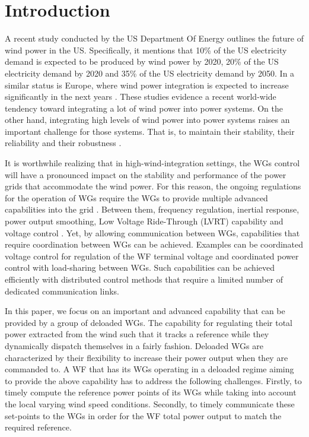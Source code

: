 \documentclass[letterpaper, 10 pt, conference]{ieeeconf}
\begin{document}
\section{Introduction}
A recent study conducted by the  US Department Of Energy \cite{windvision} outlines the future of wind power in the US.  Specifically, it mentions that   10\% of the US electricity demand is expected to be produced by wind power by 2020, 20\% of the US electricity demand  by 2020 and  35\% of the US electricity demand  by 2050. In a similar status is Europe, where wind power integration is expected to increase significantly in the next years \cite{ackerman}. These studies evidence a recent world-wide tendency toward integrating a lot of wind power into power systems. On the other hand, integrating high levels of wind power into power systems raises an important challenge for those systems. That is, to maintain their stability, their reliability and their robustness \cite{ackerman}.
\par It is worthwhile realizing that in high-wind-integration settings, the WGs control will have a pronounced impact on the stability and performance of the power grids that accommodate the wind power.  For this reason, the ongoing regulations for the operation of WGs require the WGs to provide multiple advanced capabilities into the grid \cite{ackerman}. Between them,  frequency regulation, inertial response, power output smoothing, Low Voltage Ride-Through (LVRT) capability and voltage control \cite{ackerman}. Yet, by allowing communication between WGs,  capabilities that require coordination between WGs can be achieved.  Examples can be coordinated voltage control for regulation of the WF terminal voltage and coordinated power control with load-sharing between WGs. Such capabilities can be achieved efficiently with distributed control  methods that require  a limited number of dedicated communication links. 
\par In this paper, we focus on an important and  advanced capability that can be provided by a group of deloaded WGs. The capability for regulating their total power extracted from the wind such that it tracks a reference while they dynamically dispatch themselves in a fairly fashion. Deloaded WGs are characterized by their flexibility to increase their power output when they are commanded to. A WF that has its WGs operating in a deloaded regime aiming to provide the above capability has to address the following challenges. Firstly, to timely compute the reference power points of its WGs while taking into account  the local varying wind speed conditions. Secondly, to timely communicate these set-points to the WGs in order for the WF total power output to match the required reference. 
\end{document}

